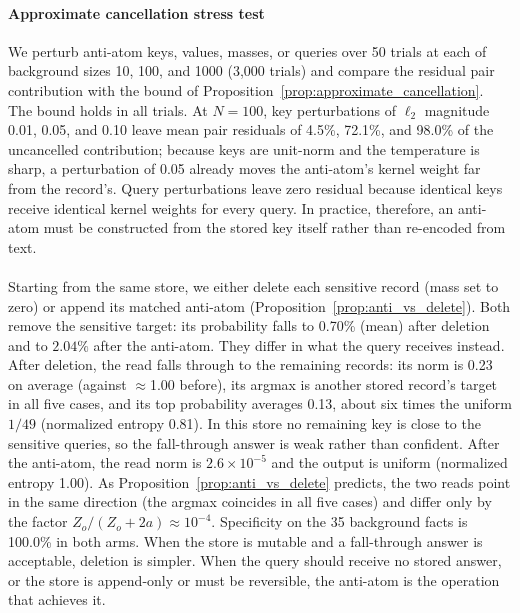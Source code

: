 \documentclass[preprint,12pt]{elsarticle}
\newif\ifmarkchanges %
\newcommand{\rev}[1]{\ifmarkchanges{\color{blue}#1}\else#1\fi} %
\providecommand{\DIFaddtex}[1]{{\protect\color{blue}\uwave{#1}}} %
\providecommand{\DIFaddbegin}{} %
\providecommand{\DIFadd}[1]{\texorpdfstring{\DIFaddtex{#1}}{#1}} %
\providecommand{\DIFaddincludegraphics}[2][]{{\color{blue}\fbox{\DIFOincludegraphics[#1]{#2}}}} %
\DeclareRobustCommand{\DIFaddbegin}{\DIFOaddbegin \let\includegraphics\DIFaddincludegraphics} %
\begin{document}
\paragraph{Approximate cancellation stress test}
We perturb anti-atom keys, values, masses, or queries over 50 trials at each of background sizes 10, 100, and 1000 (3,000 trials) and compare the residual pair contribution with the bound of Proposition~\ref{prop:approximate_cancellation}. The bound holds in all trials. At $N=100$, key perturbations of $\ell_2$ magnitude 0.01, 0.05, and 0.10 leave mean pair residuals of 4.5\%, 72.1\%, and 98.0\% of the uncancelled contribution; because keys are unit-norm and the temperature is sharp, a perturbation of 0.05 already moves the anti-atom's kernel weight far from the record's. Query perturbations leave zero residual because identical keys receive identical kernel weights for every query. In practice, therefore, an anti-atom must be constructed from the stored key itself rather than re-encoded from text.

\DIFaddbegin \paragraph{\DIFadd{Anti-atom versus deletion}}
\rev{Starting from the same store, we either delete each sensitive record (mass set to zero) or append its matched anti-atom (Proposition~\ref{prop:anti_vs_delete}). Both remove the sensitive target: its probability falls to 0.70\% (mean) after deletion and to $2.04\%$ after the anti-atom. They differ in what the query receives instead. After deletion, the read falls through to the remaining records: its norm is 0.23 on average (against $\approx$1.00 before), its argmax is another stored record's target in all five cases, and its top probability averages 0.13, about six times the uniform $1/49$ (normalized entropy 0.81). In this store no remaining key is close to the sensitive queries, so the fall-through answer is weak rather than confident. After the anti-atom, the read norm is $2.6\times10^{-5}$ and the output is uniform (normalized entropy 1.00). As Proposition~\ref{prop:anti_vs_delete} predicts, the two reads point in the same direction (the argmax coincides in all five cases) and differ only by the factor $Z_o/(Z_o+2a)\approx10^{-4}$. Specificity on the 35 background facts is 100.0\% in both arms. When the store is mutable and a fall-through answer is acceptable, deletion is simpler. When the query should receive no stored answer, or the store is append-only or must be reversible, the anti-atom is the operation that achieves it.}
\end{document}

